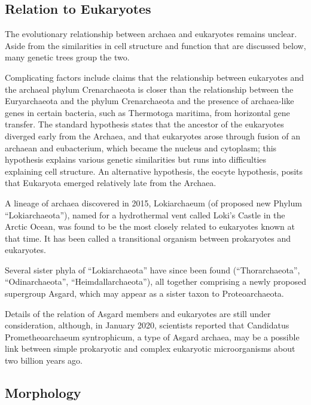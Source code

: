 \hypertarget{relation-to-eukaryotes}{%
\subsection{Relation to Eukaryotes}\label{relation-to-eukaryotes}}

The evolutionary relationship between archaea and eukaryotes remains unclear. Aside from the similarities in cell structure and function that are discussed below, many genetic trees group the two.

Complicating factors include claims that the relationship between eukaryotes and the archaeal phylum Crenarchaeota is closer than the relationship between the Euryarchaeota and the phylum Crenarchaeota and the presence of archaea-like genes in certain bacteria, such as Thermotoga maritima, from horizontal gene transfer. The standard hypothesis states that the ancestor of the eukaryotes diverged early from the Archaea, and that eukaryotes arose through fusion of an archaean and eubacterium, which became the nucleus and cytoplasm; this hypothesis explains various genetic similarities but runs into difficulties explaining cell structure. An alternative hypothesis, the eocyte hypothesis, posits that Eukaryota emerged relatively late from the Archaea.

A lineage of archaea discovered in 2015, Lokiarchaeum (of proposed new Phylum ``Lokiarchaeota''), named for a hydrothermal vent called Loki's Castle in the Arctic Ocean, was found to be the most closely related to eukaryotes known at that time. It has been called a transitional organism between prokaryotes and eukaryotes.

Several sister phyla of ``Lokiarchaeota'' have since been found (``Thorarchaeota'', ``Odinarchaeota'', ``Heimdallarchaeota''), all together comprising a newly proposed supergroup Asgard, which may appear as a sister taxon to Proteoarchaeota.

Details of the relation of Asgard members and eukaryotes are still under consideration, although, in January 2020, scientists reported that Candidatus Prometheoarchaeum syntrophicum, a type of Asgard archaea, may be a possible link between simple prokaryotic and complex eukaryotic microorganisms about two billion years ago.

\hypertarget{morphology}{%
\subsection{Morphology}\label{morphology}}


